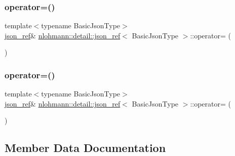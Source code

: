 \subsubsection{\texorpdfstring{operator=()}{operator=()}\hspace{0.1cm}{\footnotesize\ttfamily [1/2]}}
{\footnotesize\ttfamily template$<$typename Basic\+Json\+Type$>$ \\
\hyperlink{classnlohmann_1_1detail_1_1json__ref}{json\+\_\+ref}\& \hyperlink{classnlohmann_1_1detail_1_1json__ref}{nlohmann\+::detail\+::json\+\_\+ref}$<$ Basic\+Json\+Type $>$\+::operator= (\begin{DoxyParamCaption}\item[{const \hyperlink{classnlohmann_1_1detail_1_1json__ref}{json\+\_\+ref}$<$ Basic\+Json\+Type $>$ \&}]{ }\end{DoxyParamCaption})\hspace{0.3cm}{\ttfamily [delete]}}

\mbox{\label{classnlohmann_1_1detail_1_1json__ref_a9a73363d9be6b300ddd30745786c50a6}} 
\subsubsection{\texorpdfstring{operator=()}{operator=()}\hspace{0.1cm}{\footnotesize\ttfamily [2/2]}}
{\footnotesize\ttfamily template$<$typename Basic\+Json\+Type$>$ \\
\hyperlink{classnlohmann_1_1detail_1_1json__ref}{json\+\_\+ref}\& \hyperlink{classnlohmann_1_1detail_1_1json__ref}{nlohmann\+::detail\+::json\+\_\+ref}$<$ Basic\+Json\+Type $>$\+::operator= (\begin{DoxyParamCaption}\item[{\hyperlink{classnlohmann_1_1detail_1_1json__ref}{json\+\_\+ref}$<$ Basic\+Json\+Type $>$ \&\&}]{ }\end{DoxyParamCaption})\hspace{0.3cm}{\ttfamily [delete]}}



\subsection{Member Data Documentation}
\mbox{\label{classnlohmann_1_1detail_1_1json__ref_a434d1e18c21cc1b61954ba22b62ee7a5}} 
